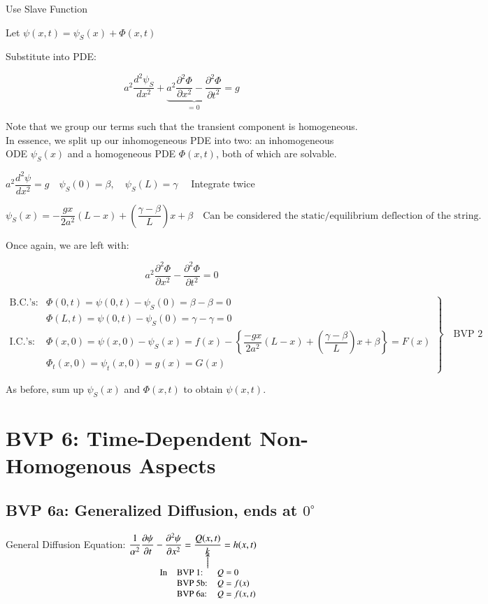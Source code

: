 \documentclass{report}
\makeatletter
\newcommand\parrow[3][3ex]{%
 \begin{array}[t]{@{}c@{}} #2 \\
  \left\uparrow\vcenter{\hrule height #1}\right.\kern-\nulldelimiterspace\\
  \makebox[0pt]{\small#3}
  \end{array}%
}
\makeatother
\begin{document}
Use Slave Function

Let $\psi(x, t)=\psi_{S}(x)+\Phi(x, t)$

Substitute into PDE:

$$
a^{2} \dfrac{d^{2} \psi_{S}}{d x^{2}}+\underbrace{a^{2} \dfrac{\partial^{2} \Phi}{\partial x^{2}}- \dfrac{\partial^{2} \Phi}{\partial t^{2}}}_{\text{= 0}}=g
$$

Note that we group our terms such that the transient component is homogeneous. In essence, we split up our inhomogeneous PDE into two: an inhomogeneous ODE $\psi_{S}(x)$ and a homogeneous PDE $\Phi(x,t)$, both of which are solvable. 

$a^{2} \dfrac{d^{2} \psi}{d x^{2}}=g \quad \psi_{S}(0)=\beta, \quad \psi_{S}(L)=\gamma \quad$ Integrate twice

\[
\boxed{
\psi_{S}(x)=-\frac{g x}{2a^{2}}(L-x)+\left(\frac{\gamma-\beta}{L}\right)x+\beta
}
\quad \text{Can be considered the static/equilibrium deflection of the string.}
\]


Once again, we are left with:

$$a^{2} \dfrac{\partial^{2} \Phi}{\partial x^{2}}-\dfrac{\partial^{2} \Phi}{\partial t^{2}}  =0$$

$\left.\begin{array}{ll}
    \text{B.C.'s}: & \Phi(0, t)  =\psi(0, t)-\psi_{S}(0)=\beta-\beta=0 \\
     & \Phi(L, t) =\psi(0, t)-\psi_{S}(0)=\gamma-\gamma=0\\
     \text{I.C.'s}: & \Phi(x, 0)=\psi(x, 0)-\psi_{S}(x)=f(x)-\left\{\dfrac{-g x}{2 a^{2}}(L-x)+\left(\dfrac{\gamma-\beta}{L}\right) x+\beta\right\}=F(x)\\
     & \Phi_{t}(x, 0)=\psi_{t}(x, 0)=g(x)=G(x)
\end{array}\right\}\quad \text{BVP 2}$

As before, sum up $\psi_{S}(x)$ and $\Phi(x,t)$ to obtain $\psi(x,t)$.

\section{BVP 6: Time-Dependent Non-Homogenous Aspects}

\subsection{BVP 6a: Generalized Diffusion, ends at $0^{\circ}$}

General Diffusion Equation: $\dfrac{1}{\alpha^{2}} \dfrac{\partial \psi}{\partial t}-\dfrac{\partial^{2} \psi}{\partial x^{2}}=\parrow{\dfrac{Q(x, t)}{k}}{$\begin{array}{lll}
    \text{In} & \text{BVP 1:} & Q=0 \\
     & \text{BVP 5b:} & Q=f(x)\\
     & \text{BVP 6a:} & Q=f(x,t)
\end{array}$}=h(x, t)$
\end{document}
